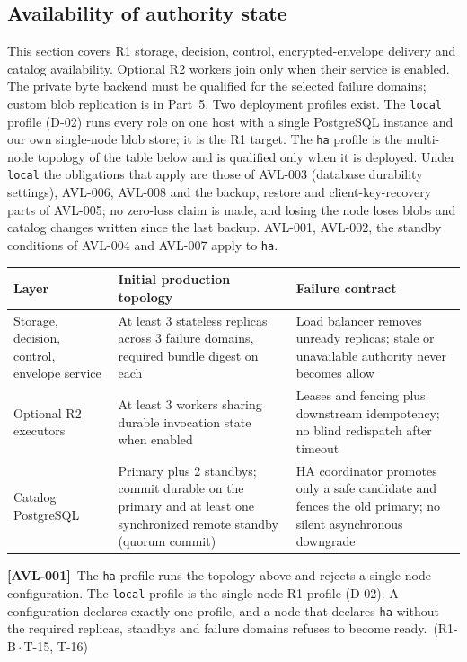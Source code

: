 \documentclass[11pt,a4paper]{article}
\newcommand{\code}[1]{{\small\nolinkurl{#1}}}
\newcommand{\reqtag}[2]{{\footnotesize\color{accent}(#1\,$\cdot$\,#2)}}
\newcommand{\req}[4]{\par\noindent\hypertarget{req:#1}{\textbf{[#1]}}\ #4\ \reqtag{#2}{#3}\par}
\begin{document}
\subsection{Availability of authority state}\label{sec:availability}
This section covers R1 storage, decision, control, encrypted-envelope delivery and catalog availability. Optional R2 workers join only when their service is enabled. The private byte backend must be qualified for the selected failure domains; custom blob replication is in Part~5. Two deployment profiles exist. The \code{local} profile (D-02) runs every role on one host with a single PostgreSQL instance and our own single-node blob store; it is the R1 target. The \code{ha} profile is the multi-node topology of the table below and is qualified only when it is deployed. Under \code{local} the obligations that apply are those of AVL-003 (database durability settings), AVL-006, AVL-008 and the backup, restore and client-key-recovery parts of AVL-005; no zero-loss claim is made, and losing the node loses blobs and catalog changes written since the last backup. AVL-001, AVL-002, the standby conditions of AVL-004 and AVL-007 apply to \code{ha}.
\begin{longtable}{@{}P{0.20\textwidth}P{0.40\textwidth}P{0.30\textwidth}@{}}
\toprule Layer & Initial production topology & Failure contract\\\midrule\endhead
Storage, decision, control, envelope service & At least 3 stateless replicas across 3 failure domains, required bundle digest on each & Load balancer removes unready replicas; stale or unavailable authority never becomes allow\\
Optional R2 executors & At least 3 workers sharing durable invocation state when enabled & Leases and fencing plus downstream idempotency; no blind redispatch after timeout\\
Catalog PostgreSQL & Primary plus 2 standbys; commit durable on the primary and at least one synchronized remote standby (quorum commit) & HA coordinator promotes only a safe candidate and fences the old primary; no silent asynchronous downgrade\\
\bottomrule
\end{longtable}
\req{AVL-001}{R1-B}{T-15, T-16}{The \code{ha} profile runs the topology above and rejects a single-node configuration. The \code{local} profile is the single-node R1 profile (D-02). A configuration declares exactly one profile, and a node that declares \code{ha} without the required replicas, standbys and failure domains refuses to become ready.}
\end{document}
